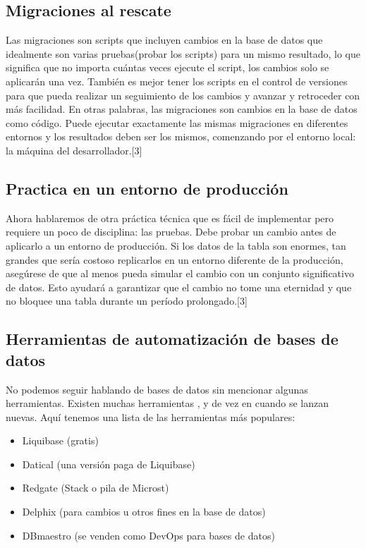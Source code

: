 \documentclass[twoside,twocolumn]{article}
\begin{document}
\subsection{Migraciones al rescate}
Las migraciones son scripts que incluyen cambios en la base de datos que idealmente son varias pruebas(probar los scripts) para un mismo resultado, lo que significa que no importa cuántas veces ejecute el script, los cambios solo se aplicarán una vez. También es mejor tener los scripts en el control de versiones para que pueda realizar un seguimiento de los cambios y avanzar y retroceder con más facilidad.
En otras palabras, las migraciones son cambios en la base de datos como código. Puede ejecutar exactamente las mismas migraciones en diferentes entornos y los resultados deben ser los mismos, comenzando por el entorno local: la máquina del desarrollador.[3]

\subsection{Practica en un entorno de producción}
Ahora hablaremos de otra práctica técnica que es fácil de implementar pero requiere un poco de disciplina:
las pruebas.
Debe probar un cambio antes de aplicarlo a un entorno de producción. Si los datos de la tabla son enormes, tan grandes que sería costoso replicarlos en un entorno diferente de la producción, asegúrese de que al menos pueda simular el cambio con un conjunto significativo de datos. Esto ayudará a garantizar que el cambio no tome una eternidad y que no bloquee una tabla durante un período prolongado.[3]

\subsection{Herramientas de automatización de bases de datos}
No podemos seguir hablando de bases de datos sin mencionar algunas herramientas. Existen muchas herramientas , y de vez en cuando se lanzan nuevas. Aquí tenemos una lista de las herramientas más populares:
\begin{itemize}
\item Liquibase (gratis)
\item Datical (una versión paga de Liquibase)
\item Redgate (Stack o pila de Microst)
\item Delphix (para cambios u otros fines en la base de datos)
\item DBmaestro (se venden como DevOps para bases de datos)
\end{itemize}
\end{document}
